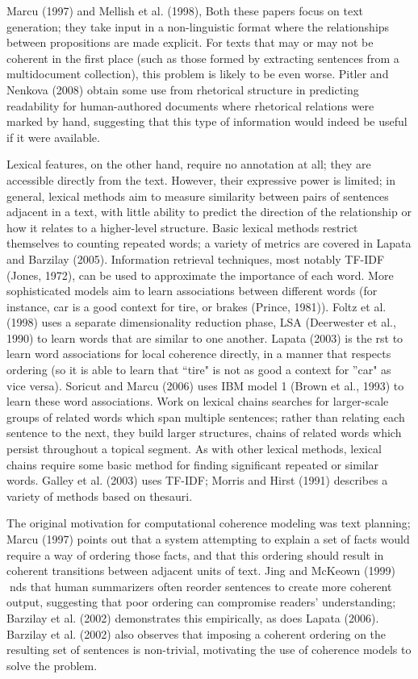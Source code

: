 Marcu (1997) and Mellish et al. (1998), Both these papers focus on text generation; they take
input in a non-linguistic format where the relationships between propositions are made explicit. 
For texts that may or may not be coherent in the first place (such as those formed
by extracting sentences from a multidocument collection), this problem is likely to be even worse. Pitler
and Nenkova (2008) obtain some use from rhetorical structure in predicting readability for human-authored
documents where rhetorical relations were marked by hand, suggesting that this type of information would
indeed be useful if it were available.

Lexical features, on the other hand, require no annotation at all; they are accessible directly from the text.
However, their expressive power is limited; in general, lexical methods aim to measure similarity between
pairs of sentences adjacent in a text, with little ability to predict the direction of the relationship or how it
relates to a higher-level structure. Basic lexical methods restrict themselves to counting repeated words; a
variety of metrics are covered in Lapata and Barzilay (2005). Information retrieval techniques, most notably
TF-IDF (Jones, 1972), can be used to approximate the importance of each word. More sophisticated models
aim to learn associations between different words (for instance, car is a good context for tire, or brakes
(Prince, 1981)). Foltz et al. (1998) uses a separate dimensionality reduction phase, LSA (Deerwester et al.,
1990) to learn words that are similar to one another. Lapata (2003) is the rst to learn word associations for
local coherence directly, in a manner that respects ordering (so it is able to learn that ``tire" is not as good a
context for ''car" as vice versa). Soricut and Marcu (2006) uses IBM model 1 (Brown et al., 1993) to learn
these word associations.
Work on lexical chains searches for larger-scale groups of related words which span multiple sentences;
rather than relating each sentence to the next, they build larger structures, chains of related words which
persist throughout a topical segment. As with other lexical methods, lexical chains require some basic method
for finding significant repeated or similar words. Galley et al. (2003) uses TF-IDF; Morris and Hirst (1991)
describes a variety of methods based on thesauri.

The original motivation for computational coherence modeling was text planning; Marcu (1997) points out
that a system attempting to explain a set of facts would require a way of ordering those facts, and that this
ordering should result in coherent transitions between adjacent units of text.
Jing and McKeown
(1999) nds that human summarizers often reorder sentences to create more coherent output, suggesting that
poor ordering can compromise readers' understanding; Barzilay et al. (2002) demonstrates this empirically,
as does Lapata (2006). Barzilay et al. (2002) also observes that imposing a coherent ordering on the resulting
set of sentences is non-trivial, motivating the use of coherence models to solve the problem. 

